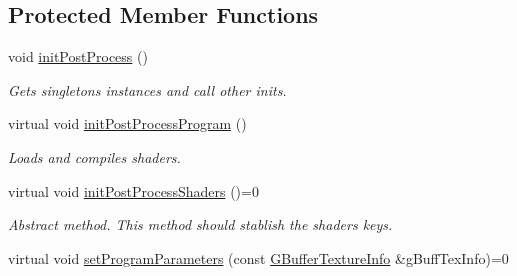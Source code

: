 \subsection*{Protected Member Functions}
\begin{DoxyCompactItemize}
\item 
\mbox{\label{class_geometry_engine_1_1_geometry_post_process_1_1_post_process_a9f680e91835d614dcc942fafe43bd3ae}} 
void \mbox{\hyperlink{class_geometry_engine_1_1_geometry_post_process_1_1_post_process_a9f680e91835d614dcc942fafe43bd3ae}{init\+Post\+Process}} ()
\begin{DoxyCompactList}\small\item\em Gets singletons instances and call other inits. \end{DoxyCompactList}\item 
\mbox{\label{class_geometry_engine_1_1_geometry_post_process_1_1_post_process_a1bd949b51ac91a8630d8df0a4e966afa}} 
virtual void \mbox{\hyperlink{class_geometry_engine_1_1_geometry_post_process_1_1_post_process_a1bd949b51ac91a8630d8df0a4e966afa}{init\+Post\+Process\+Program}} ()
\begin{DoxyCompactList}\small\item\em Loads and compiles shaders. \end{DoxyCompactList}\item 
\mbox{\label{class_geometry_engine_1_1_geometry_post_process_1_1_post_process_a8a478b601f4d3021c33cbc376310e235}} 
virtual void \mbox{\hyperlink{class_geometry_engine_1_1_geometry_post_process_1_1_post_process_a8a478b601f4d3021c33cbc376310e235}{init\+Post\+Process\+Shaders}} ()=0
\begin{DoxyCompactList}\small\item\em Abstract method. This method should stablish the shaders keys. \end{DoxyCompactList}\item 
\mbox{\label{class_geometry_engine_1_1_geometry_post_process_1_1_post_process_ae4bd80f5d0f0768fd4e2141a95ff5bb0}} 
virtual void \mbox{\hyperlink{class_geometry_engine_1_1_geometry_post_process_1_1_post_process_ae4bd80f5d0f0768fd4e2141a95ff5bb0}{set\+Program\+Parameters}} (const \mbox{\hyperlink{struct_geometry_engine_1_1_g_buffer_texture_info}{G\+Buffer\+Texture\+Info}} \&g\+Buff\+Tex\+Info)=0

\end{DoxyCompactItemize}
